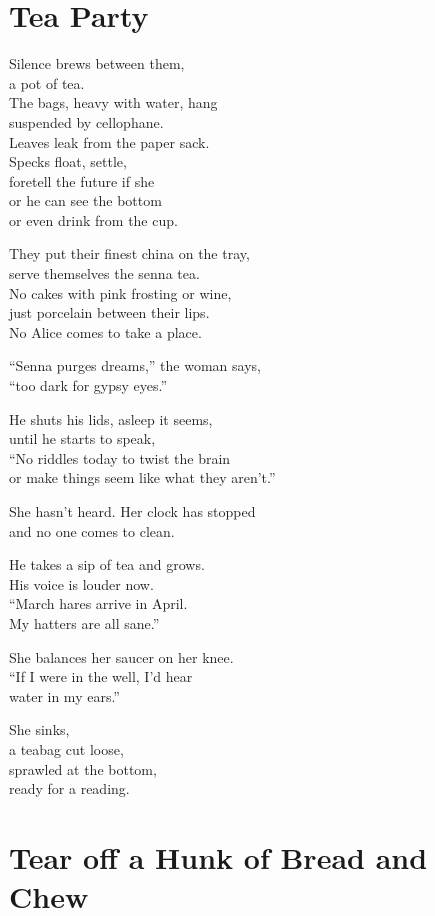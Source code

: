 \documentclass[twoside,10pt]{book}
\begin{document}
\clearpage
\section{Tea Party}

Silence brews between them,\\
a pot of tea.\\
The bags, heavy with water, hang\\
suspended by cellophane.\\
Leaves leak from the paper sack.\\
Specks float, settle,\\
foretell the future if she\\
or he can see the bottom\\
or even drink from the cup.

They put their finest china on the tray,\\
serve themselves the senna tea.\\
No cakes with pink frosting or wine,\\
just porcelain between their lips.\\
No Alice comes to take a place.

``Senna purges dreams,'' the woman says,\\
``too dark for gypsy eyes.''

He shuts his lids, asleep it seems,\\
until he starts to speak,\\
``No riddles today to twist the brain\\
or make things seem like what they aren't.''

She hasn't heard. Her clock has stopped\\
and no one comes to clean.

He takes a sip of tea and grows.\\
His voice is louder now.\\
``March hares arrive in April.\\
My hatters are all sane.''

She balances her saucer on her knee.\\
``If I were in the well, I'd hear\\
water in my ears.''

She sinks,\\
a teabag cut loose,\\
sprawled at the bottom,\\
ready for a reading.


\clearpage
\section{Tear off a Hunk of Bread and Chew}
\end{document}
